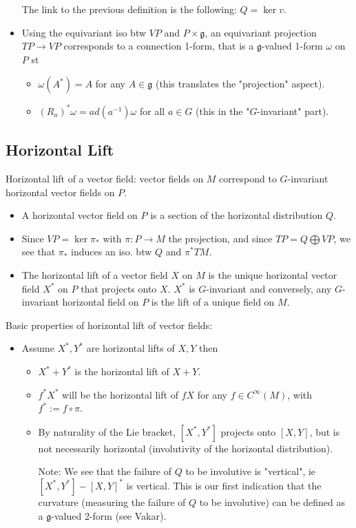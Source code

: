 \documentclass{report}
\theoremstyle{definition}
\begin{document}
\begin{itemize}
    The link to the previous definition is the following: $Q=\ker v$.

    \item Using the equivariant iso btw $VP$ and $P\times\mathfrak{g}$, an equivariant projection $TP\to VP$ corresponds to a connection 1-form, that is a $\mathfrak{g}$-valued 1-form $\omega$ on $P$ st
    \begin{itemize}
        \item $\omega(A^*)=A$ for any $A\in \mathfrak{g}$ (this translates the "projection" aspect).
        \item $(R_a)^*\omega=ad(a^{-1})\omega$ for all $a\in G$ (this in the "$G$-invariant" part).
    \end{itemize}
\end{itemize}

\subsection{Horizontal Lift}

Horizontal lift of a vector field: vector fields on $M$ correspond to $G$-invariant horizontal vector fields on $P$.
\begin{itemize}
    \item A horizontal vector field on $P$ is a section of the horizontal distribution $Q$.
    \item Since $VP=\ker \pi_*$ with $\pi:P\to M$ the projection, and since $TP=Q\bigoplus VP$, we see that $\pi_*$ induces an iso. btw $Q$ and $\pi^*TM$.
    \item The horizontal lift of a vector field $X$ on $M$ is the unique horizontal vector field $X^*$ on $P$ that projects onto $X$. $X^*$ is $G$-invariant and conversely, any $G$-invariant horizontal field on $P$ is the lift of a unique field on $M$.
\end{itemize}

Basic properties of horizontal lift of vector fields:
\begin{itemize}
    \item Assume $X^*,Y^*$ are horizontal lifts of $X,Y$ then
    \begin{itemize}
        \item $X^*+Y^*$ is the horizontal lift of $X+Y$.
        \item $f^*X^*$ will be the horizontal lift of $fX$ for any $f\in C^{\infty}(M)$, with $f^*:=f\circ\pi$.
        \item By naturality of the Lie bracket, $[X^*,Y^*]$ projects onto $[X,Y]$, but is not necessarily horizontal (involutivity of the horizontal distribution). 
        
        Note: We see that the failure of $Q$ to be involutive is "vertical", ie $[X^*,Y^*]-[X,Y]^*$ is vertical. This is our first indication that the curvature (measuring the failure of $Q$ to be involutive) can be defined as a $\mathfrak{g}$-valued 2-form (see Vakar).
    \end{itemize}
\end{itemize}
\end{document}
